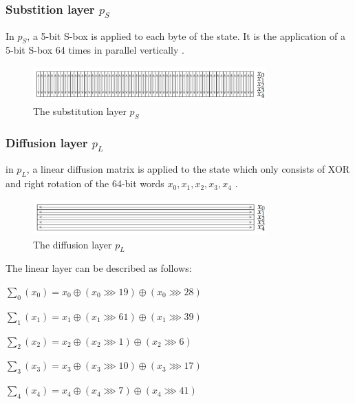 \subsubsection{Substition layer $p_S$}
In $p_S$, a 5-bit S-box is applied to each byte of the state. It is the application of a 5-bit S-box 64 times in parallel vertically \cite{ascon_specification, analysis_of_ascon}.

\begin{figure}[htbp]
  \centering
  \includegraphics[width=0.8\textwidth]{images/substitution.png}
  \caption{The substitution layer $p_S$ \cite{DBLP:journals/joc/DobraunigEMS21}}
  \label{fig:substition}
\end{figure}

\subsubsection{Diffusion layer $p_L$}
in $p_L$, a linear diffusion matrix is applied to the state which only consists of XOR and right rotation of the 64-bit words $x_0, x_1, x_2, x_3, x_4$ \cite{ascon_specification, analysis_of_ascon}.

\begin{figure}[htbp]
  \centering
  \includegraphics[width=0.8\textwidth]{images/diffusion.png}
  \caption{The diffusion layer $p_L$ \cite{DBLP:journals/joc/DobraunigEMS21}}
  \label{fig:diffusion}
\end{figure}

The linear layer can be described as follows:


$\sum_0 (x_0) = x_0 \oplus (x_0 \ggg 19) \oplus (x_0 \ggg 28)$

$\sum_1 (x_1) = x_1 \oplus (x_1 \ggg 61) \oplus (x_1 \ggg 39)$

$\sum_2 (x_2) = x_2 \oplus (x_2 \ggg 1) \oplus (x_2 \ggg 6)$

$\sum_3 (x_3) = x_3 \oplus (x_3 \ggg 10) \oplus (x_3 \ggg 17)$

$\sum_4 (x_4) = x_4 \oplus (x_4 \ggg 7) \oplus (x_4 \ggg 41)$ 

\cite{ascon_specification,analysis_of_ascon}


